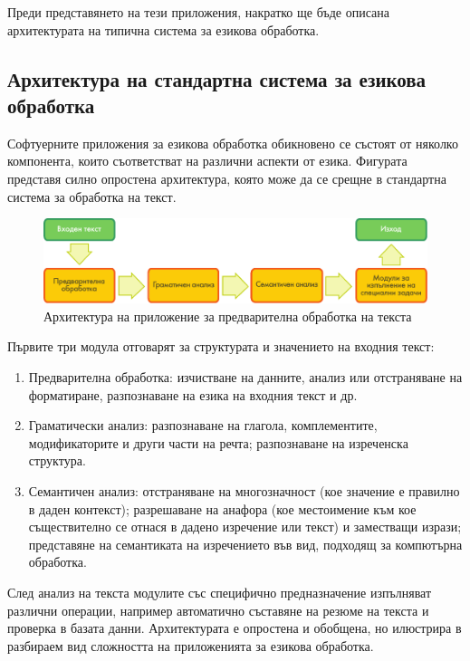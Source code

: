 \documentclass[]{../../metanetpaper}
\begin{document}
\begin{multicols}{2}
Преди представянето на тези приложения, накратко ще бъде описана  архитектурата на типична система за езикова обработка.

\subsection{Архитектура на стандартна система за езикова обработка}

Софтуерните приложения за езикова обработка обикновено се състоят от няколко компонента, които съответстват на различни аспекти от езика. Фигурата представя силно опростена архитектура, която може да се срещне в стандартна система за обработка на текст. 

\begin{figure}[b]
  \center
  \includegraphics[width=\textwidth]{../_media/bulgarian/text_processing_app_architecture}
  \caption{Архитектура на приложение за предварителна обработка на текста}
  \label{fig:textprocessingarch_de}
\end{figure}

Първите три модула отговарят за структурата и значението на входния
текст:

\begin{enumerate}
\item Предварителна обработка: изчистване на данните, анализ или отстраняване на форматиране, разпознаване на езика на входния текст и др. 
\item Граматически анализ: разпознаване на глагола, комплементите, модификаторите и други части на речта; разпознаване на изреченска структура. 
\item Семантичен анализ: отстраняване на многозначност (кое значение е правилно в даден контекст); разрешаване на анафора (кое местоимение към кое съществително се отнася в дадено изречение или текст) и заместващи изрази; представяне на семантиката на изречението във вид, подходящ за компютърна обработка. 
\end{enumerate}

След анализ на текста модулите със специфично предназначение изпълняват различни операции, например автоматично съставяне на резюме на текста и проверка в базата данни. Архитектурата е опростена и обобщена, но илюстрира в разбираем вид сложността на приложенията за езикова обработка. 


\end{multicols}
\end{document}
